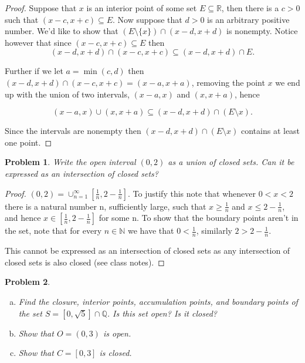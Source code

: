 \documentclass[11pt]{article}
\theoremstyle{plain}
\newtheorem{problem}{Problem}
\theoremstyle{remark}
\newcommand {\mbR} {\mathbb R}
\newcommand {\mbN} {\mathbb N}
\newcommand {\mbQ} {\mathbb Q}
\begin{document}
	\begin{proof}
		
		Suppose that $x$ is an interior point of some set $E\subseteq \mbR$, then there is a $c>0$ such that $(x-c,x+c)\subseteq E$. Now suppose that $d>0$ is an arbitrary positive number. We'd like to show that $(E\setminus \{x\})\cap (x-d,x+d)$ is nonempty. Notice however that since $(x-c,x+c)\subseteq E $ then \[(x-d,x+d)\cap (x-c,x+c)\subseteq (x-d,x+d)\cap E.\]
		
		Further if we let $a = \min (c,d)$ then $(x-d,x+d)\cap (x-c,x+c)=(x-a,x+a)$, removing the point ${x}$ we end up with the union of two intervals, $(x-a,x)$ and $(x,x+a)$, hence
		
		\[(x-a,x)\cup (x,x+a)\subseteq (x-d,x+d)\cap (E\setminus {x}).\]
		
		Since the intervals are nonempty then $(x-d,x+d)\cap (E\setminus {x})$ contains at least one point.
		
		
	\end{proof}

	\begin{problem}
		Write the open interval $(0,2)$ as a union of closed sets. Can it be expressed as an intersection of closed sets?
	\end{problem}
	\begin{proof}
		$(0,2) = \displaystyle\cup_{n=1}^\infty \left[\frac 1 n, 2-\frac{1}{n}\right]$. To justify this note that whenever $0<x<2$ there is a natural number n, sufficiently large, such that $x\geq \frac 1 n$ and $x\leq 2 - \frac 1 n$, and hence $x\in [\frac 1 n, 2-\frac{1}{n}]$ for some n. To show that the boundary points aren't in the set, note that for every $n\in \mbN$ we have that $0< \frac 1 n$, similarly $2> 2-\frac 1 n$.
		
		This cannot be expressed as an intersection of closed sets as any intersection of closed sets is also closed (see class notes).
	\end{proof}
	\begin{problem}
		
		\begin{enumerate} [(a)]
		\item Find the closure, interior points, accumulation points, and boundary points of the set $S=[0,\sqrt 5] \cap \mbQ$. Is this set open? Is it closed?
		
		\item Show that $O=(0,3)$ is open. 
		
		\item Show that $C=[0,3]$ is closed.
		
	\end{enumerate}
	\end{problem}
\end{document}
